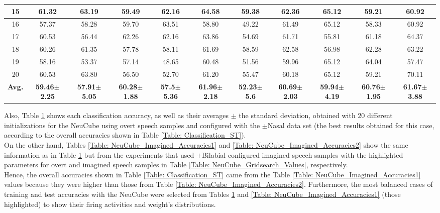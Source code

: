 \begin{table}[h!]
{\begin{tabular}{|*{11}{c|}}
		15 & 61.32 & 63.19 & 59.49 & 62.16 & 64.58 & 59.38 & \cellcolor{orange}62.36 & \cellcolor{orange}65.12 & 59.21 & 60.92 \\\hline
		16 & 57.37 & 58.28 & 59.70 & 63.51 & 58.80 & 49.22 & 61.49 & 65.12 & 58.33 & 60.92 \\\hline
		17 & 60.53 & 56.44 & 62.26 & 62.16 & 63.86 & 54.69 & 61.71 & 55.81 & 61.18 & 64.37 \\\hline
		18 & 60.26 & 61.35 & 57.78 & 58.11 & 61.69 & 58.59 & 62.58 & 56.98 & 62.28 & 63.22 \\\hline
		19 & 58.16 & 53.37 & 57.14 & 48.65 & 60.48 & 51.56 & 59.96 & 65.12 & 64.04 & 57.47 \\\hline
		20 & 60.53 & 63.80 & 56.50 & 52.70 & 61.20 & 55.47 & 60.18 & 65.12 & 59.21 & 70.11 \\\hline
		\textbf{Avg.} & \textbf{59.46}\boldmath$\pm$\textbf{2.25} & \textbf{57.91}\boldmath$\pm$\textbf{5.05} & \textbf{60.28}\boldmath$\pm$\textbf{1.88} & \textbf{57.5}\boldmath$\pm$\textbf{5.36} & \textbf{61.96}\boldmath$\pm$\textbf{2.18} & \textbf{52.23}\boldmath$\pm$\textbf{5.6} & \textbf{60.69}\boldmath$\pm$\textbf{2.03} & \textbf{59.94}\boldmath$\pm$\textbf{4.19} & \textbf{60.76}\boldmath$\pm$\textbf{1.95} & \textbf{61.67}\boldmath$\pm$\textbf{3.88} \\\hline
	\end{tabular}%
	}
	\label{Table: NeuCube_Overt_Accuracies}%
\end{table}%

Also, Table \ref{Table: NeuCube_Overt_Accuracies} shows each classification accuracy, as well as their averages $\pm$ the standard deviation, obtained with 20 different initializations for the NeuCube using overt speech samples and configured with the $\pm$Nasal data set (the best results obtained for this case, according to the overall accuracies shown in Table \ref{Table: Classification_ST}).\\

On the other hand, Tables \ref{Table: NeuCube_Imagined_Accuracies1} and \ref{Table: NeuCube_Imagined_Accuracies2}  show the same information as in Table \ref{Table: NeuCube_Overt_Accuracies} but from the experiments that used $\pm$Bilabial configured imagined speech samples with the highlighted parameters for overt and imagined speech samples in Table \ref{Table: NeuCube_Gridsearch_Values}, respectively.\\

Hence, the overall accuracies shown in Table \ref{Table: Classification_ST} came from the Table \ref{Table: NeuCube_Imagined_Accuracies1} values because they were higher than those from Table \ref{Table: NeuCube_Imagined_Accuracies2}. Furthermore, the most balanced cases of training and test accuracies with the NeuCube were selected from Tables \ref{Table: NeuCube_Overt_Accuracies} and \ref{Table: NeuCube_Imagined_Accuracies1} (those highlighted) to show their firing activities and weight's distributions.\\

